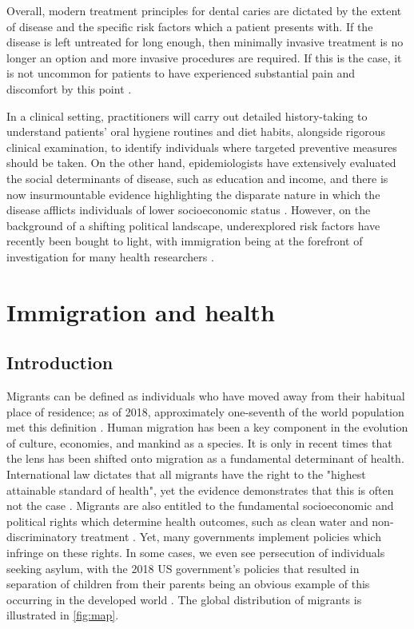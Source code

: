 Overall, modern treatment principles for dental caries are dictated by the extent of disease and the specific risk factors which a patient presents with. If the disease is left untreated for long enough, then minimally invasive treatment is no longer an option and more invasive procedures are required. If this is the case, it is not uncommon for patients to have experienced substantial pain and discomfort by this point \citep{iqbal2007}.

In a clinical setting, practitioners will carry out detailed history-taking to understand patients' oral hygiene routines and diet habits, alongside rigorous clinical examination, to identify individuals where targeted preventive measures should be taken. On the other hand, epidemiologists have extensively evaluated the social determinants of disease, such as education and income, and there is now insurmountable evidence highlighting the disparate nature in which the disease afflicts individuals of lower socioeconomic status \citep{baker2014}. However, on the background of a shifting political landscape, underexplored risk factors have recently been bought to light, with immigration being at the forefront of investigation for many health researchers \citep{abubakr2018}.

\section{Immigration and health}

\subsection{Introduction}

Migrants can be defined as individuals who have moved away from their habitual place of residence; as of 2018, approximately one-seventh of the world population met this definition \citep{abubakr2018}. Human migration has been a key component in the evolution of culture, economies, and mankind as a species. It is only in recent times that the lens has been shifted onto migration as a fundamental determinant of health. International law dictates that all migrants have the right to the "highest attainable standard of health", yet the evidence demonstrates that this is often not the case \citep{un1976, abubakr2018}. Migrants are also entitled to the fundamental socioeconomic and political rights which determine health outcomes, such as clean water and non-discriminatory treatment \citep{abubakr2018}. Yet, many governments implement policies which infringe on these rights. In some cases, we even see persecution of individuals seeking asylum, with the 2018 US government's policies that resulted in separation of children from their parents being an obvious example of this occurring in the developed world \citep{abubakr2018}. The global distribution of migrants is illustrated in \autoref{fig:map}.

